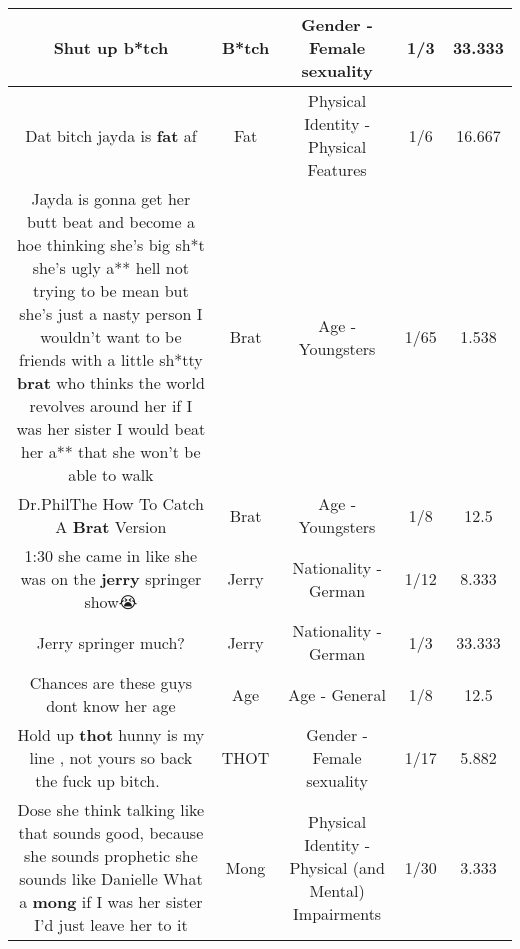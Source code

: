 \documentclass[11pt]{article}
\newlength\mylength
\begin{document}
\begin{center}
\begin{longtable}{|C{.65\mylength}|C{.30\mylength}|C{.12\mylength}|C{.12\mylength}|C{.12\mylength}|}
  \small Shut up b*tch\normalsize   & B*tch & Gender - Female sexuality & 1/3 & 33.333 \\  \hline
  \small Dat bitch jayda is \textbf{fat} af\normalsize   & Fat & Physical Identity - Physical Features & 1/6 & 16.667 \\  \hline
  \small Jayda is gonna get her butt beat and become a hoe thinking she's big sh*t she's ugly a** hell not trying to be mean but she's just a nasty person I wouldn't want to be friends with a little sh*tty \textbf{brat} who thinks the world revolves around her if I was her sister I would beat her a** that she won't be able to walk\normalsize   & Brat & Age - Youngsters & 1/65 & 1.538 \\  \hline
  \small Dr.PhilThe How To Catch A \textbf{Brat} Version\normalsize   & Brat & Age - Youngsters & 1/8 & 12.5 \\  \hline
  \small 1:30 she came in like she was on the \textbf{jerry} springer show😭\normalsize   & Jerry & Nationality - German & 1/12 & 8.333 \\  \hline
  \small Jerry springer much?\normalsize   & Jerry & Nationality - German & 1/3 & 33.333 \\  \hline
  \small Chances are these guys dont know her age\normalsize   & Age & Age - General & 1/8 & 12.5 \\  \hline
  \small Hold up \textbf{thot} hunny is my line , not yours so back the fuck up bitch.😬😬😬😬😬😬\normalsize   & THOT & Gender - Female sexuality & 1/17 & 5.882 \\  \hline
  \small Dose she think talking like that sounds good, because she sounds prophetic she sounds like Danielle What a \textbf{mong} if I was her sister I'd just leave her to it\normalsize   & Mong & Physical Identity - Physical (and Mental) Impairments & 1/30 & 3.333 \\  \hline

\end{longtable}
\end{center}
\end{document}
